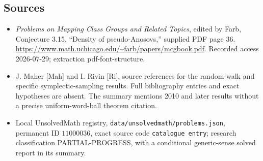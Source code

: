 \documentclass[11pt]{article}
\begin{document}
\subsection{Sources}
\begin{itemize}
\item \emph{Problems on Mapping Class Groups and Related Topics}, edited by Farb, Conjecture 3.15, ``Density of pseudo-Anosovs,'' supplied PDF page 36. \url{https://www.math.uchicago.edu/~farb/papers/mcgbook.pdf}. Recorded access 2026-07-29; extraction pdf-font-structure.
\item J. Maher [Mah] and I. Rivin [Ri], source references for the random-walk and specific symplectic-sampling results. Full bibliography entries and exact hypotheses are absent. The summary mentions 2010 and later results without a precise uniform-word-ball theorem citation.
\item Local UnsolvedMath registry, \texttt{data/unsolvedmath/problems.json}, permanent ID \(11000036\), exact source code \texttt{catalogue entry}; research classification PARTIAL-PROGRESS, with a conditional generic-sense solved report in its summary.
\end{itemize}
\end{document}
